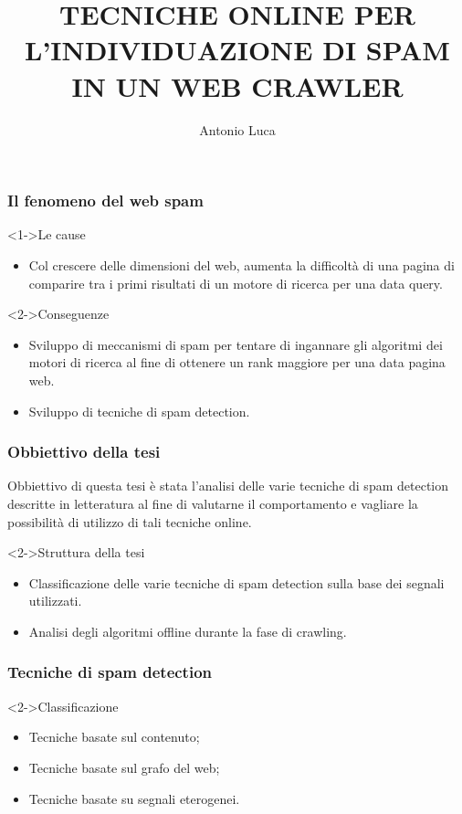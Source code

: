 \documentclass{beamer}
\title[Tesi di Laurea]{TECNICHE ONLINE PER L’INDIVIDUAZIONE DI SPAM IN UN WEB CRAWLER}
\institute{Università degli Studi di Milano}
\author{Antonio Luca}
\begin{document}
\begin{frame}
  \maketitle
\end{frame}
\begin{frame}
    \frametitle{Il fenomeno del web spam}
    \begin{block}<1->{Le cause}
    \begin{itemize}
    \item<1->Col crescere delle dimensioni del web, aumenta la difficoltà di una pagina di comparire tra i primi risultati di un motore di ricerca per una data query.
    \end{itemize}
    \end{block}
    \begin{block}<2->{Conseguenze}
    \begin{itemize}
        \item<1->Sviluppo di meccanismi di spam per tentare di ingannare gli algoritmi dei motori di ricerca al fine di ottenere un rank maggiore per una data pagina web. 
        \item<2->Sviluppo di tecniche di spam detection.
    \end{itemize}
    \end{block}
\end{frame}
\begin{frame}
  \frametitle{Obbiettivo della tesi}  
  Obbiettivo di questa tesi è stata l’analisi delle varie tecniche di spam detection descritte in letteratura al fine di valutarne il comportamento e vagliare la possibilità di utilizzo di tali tecniche online.
  \begin{block}<2->{Struttura della tesi}
  \begin{itemize}
  \item Classificazione delle varie tecniche di spam detection sulla base dei segnali utilizzati.
  \item Analisi degli algoritmi offline durante la fase di crawling.
  \end{itemize}
  \end{block}
\end{frame}
 \begin{frame}
     \frametitle{Tecniche di spam detection}
     \begin{block}<2->{Classificazione}
     \begin{itemize}
     \item<3->Tecniche basate sul contenuto;	
     \item<4->Tecniche basate sul grafo del web;
     \item<5->Tecniche basate su segnali eterogenei.
     \end{itemize}
     \end{block}
 \end{frame}
\end{document}
